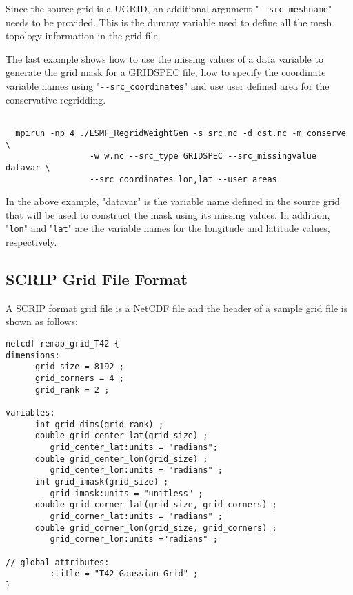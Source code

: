 Since the source grid is a UGRID, an additional argument "{\tt \verb+--+src\_meshname}" needs to be provided.  This is the dummy variable used to define all the mesh topology information in the 
grid file.

The last example shows how to use the missing values of a data variable to generate the 
grid mask for a GRIDSPEC file, how to specify the coordinate variable names 
using "{\tt \verb+--+src\_coordinates}"
 and use user defined area for the conservative regridding.

\begin{verbatim}

  mpirun -np 4 ./ESMF_RegridWeightGen -s src.nc -d dst.nc -m conserve \
                 -w w.nc --src_type GRIDSPEC --src_missingvalue datavar \
                 --src_coordinates lon,lat --user_areas

\end{verbatim}
  
In the above example, "datavar" is the variable name defined in the source grid that will
 be used to construct the mask using its missing values.  In addition, "{\tt lon}" and "{\tt lat}" are the
variable names for the longitude and latitude values, respectively.

\subsection{SCRIP Grid File Format}\label{sec:fileformat:scrip}

A SCRIP format grid file is a NetCDF file and the header of a sample grid file is shown as follows:

\begin{verbatim}
netcdf remap_grid_T42 {
dimensions:
      grid_size = 8192 ;
      grid_corners = 4 ;
      grid_rank = 2 ;

variables:
      int grid_dims(grid_rank) ;
      double grid_center_lat(grid_size) ;
         grid_center_lat:units = "radians";
      double grid_center_lon(grid_size) ;
         grid_center_lon:units = "radians" ;
      int grid_imask(grid_size) ;
         grid_imask:units = "unitless" ;
      double grid_corner_lat(grid_size, grid_corners) ;
         grid_corner_lat:units = "radians" ;
      double grid_corner_lon(grid_size, grid_corners) ;
         grid_corner_lon:units ="radians" ;

// global attributes:
         :title = "T42 Gaussian Grid" ;
}
\end{verbatim}

